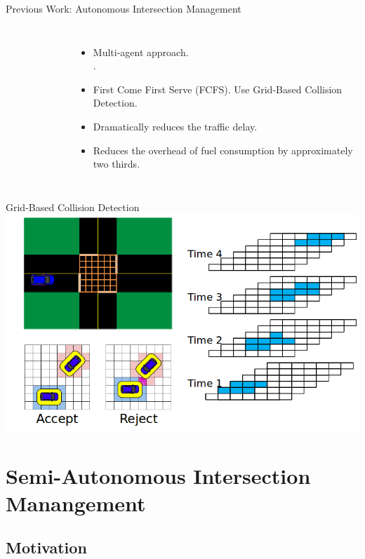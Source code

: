 \documentclass{beamer}
\begin{document}
\begin{frame}{Previous Work: Autonomous Intersection Management}
\begin{columns}[c]
		\begin{center}
		\begin{figure}
		\end{figure}
		\end{center}
				
		\begin{itemize}
		\item Multi-agent approach.\\\cite{bib:Dresner08Multiagent}.
		\item First Come First Serve (FCFS). Use Grid-Based Collision Detection.\pause
		\item Dramatically reduces the traffic delay.
		\item Reduces the overhead of fuel consumption by approximately
		two thirds.
		\end{itemize}
\end{columns}
\end{frame}

\begin{frame}{Grid-Based Collision Detection}
	\includegraphics[width=\textwidth]{grids.png}
\end{frame}

\section{Semi-Autonomous Intersection Manangement}

\subsection{Motivation}
\end{document}
